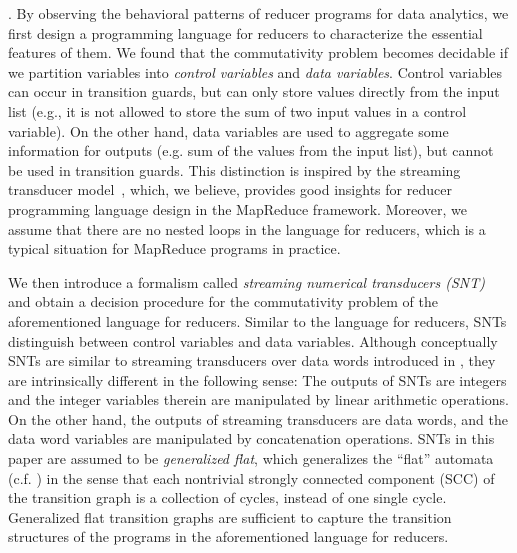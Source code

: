 
\smallskip

.
By observing the behavioral patterns of reducer programs for data analytics, we first design a programming language for reducers to characterize the essential features of them. %
We found that the commutativity problem becomes decidable if we partition variables into \emph{control variables} and \emph{data variables}. Control variables can occur in transition guards, but can only store values directly from the input list (e.g., it is not allowed to store the sum of two input values in a control variable). On the other hand, data variables are used to aggregate some information for outputs (e.g. sum of the values from the input list), but cannot be used in transition guards. This distinction is inspired by the streaming transducer model~\cite{RP11}, which, we believe, provides good insights for reducer programming language design in the MapReduce framework. Moreover, we assume that there are no nested loops in the language for reducers, which is a typical situation for MapReduce programs in practice.

We then introduce a formalism called \emph{streaming numerical transducers (SNT)} and obtain a decision procedure for the commutativity problem of the aforementioned language for reducers.
Similar to the language for reducers, SNTs distinguish between control variables and data variables. Although conceptually SNTs are similar to streaming transducers over data words introduced in \cite{RP11}, they are intrinsically different in the following sense: The outputs of SNTs are integers and the integer variables therein are manipulated by linear arithmetic operations. On the other hand, the outputs of streaming transducers are data words, and the data word variables are manipulated by concatenation operations. SNTs in this paper are assumed to be \emph{generalized flat}, which generalizes the ``flat'' automata (c.f. \cite{LS06}) in the sense that each nontrivial strongly connected component (SCC) of the transition graph is a collection of cycles, instead of one single cycle. Generalized flat transition graphs are sufficient to capture the transition structures of the programs in the aforementioned language for reducers.

